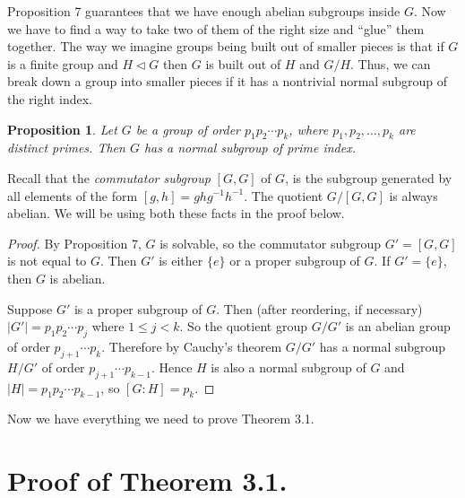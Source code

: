 \documentclass[12pt,reqno]{amsart}
\theoremstyle{plain}
\newtheorem{prop}[thm]{Proposition}
\theoremstyle{definition}
\numberwithin{equation}{section}
\begin{document}

Proposition 7 guarantees that we have enough abelian subgroups inside $G$. Now we have to find a way to take two of them of the right size and ``glue'' them together. The way we imagine groups being built out of smaller pieces is that if $G$ is a finite group and $H\lhd G$ then $G$ is built out of $H$ and $G/H$. Thus, we can break down a group into smaller pieces if it has a nontrivial normal subgroup of the right index.

\begin{prop}
Let $G$ be a group of order $p_1 p_2 \cdots p_k$, where $p_1, p_2, \dots, p_k$ are distinct primes. Then $G$ has a normal subgroup of prime index.
\end{prop}
Recall that the \textit{commutator subgroup} $[G,G]$ of $G$, is the subgroup generated by all elements of the form $[g,h]=ghg^{-1}h^{-1}$. The quotient $G/[G,G]$ is always abelian. We will be using both these facts in the proof below.
\begin{proof}
By Proposition 7, $G$ is solvable, so the commutator subgroup $G' = [G, G]$ is not equal to $G$. Then $G'$ is either $\{e\}$ or a proper subgroup of $G$. If $G' = \{e\}$, then $G$ is abelian.

Suppose $G'$ is a proper subgroup of $G$. Then (after reordering, if necessary) $|G'| = p_1 p_2 \cdots p_j$ where $1 \le j < k$. So the quotient group $G/G'$ is an abelian group of order $p_{j+1} \cdots p_k$. Therefore by Cauchy's theorem $G/G'$ has a normal subgroup $H/G'$ of order $p_{j+1} \cdots p_{k-1}$. Hence $H$ is also a normal subgroup of $G$ and $|H| = p_1 p_2 \cdots p_{k-1}$, so $[G:H] = p_k$.
\end{proof}

Now we have everything we need to prove Theorem 3.1.

\section{Proof of Theorem 3.1.}
\end{document}
